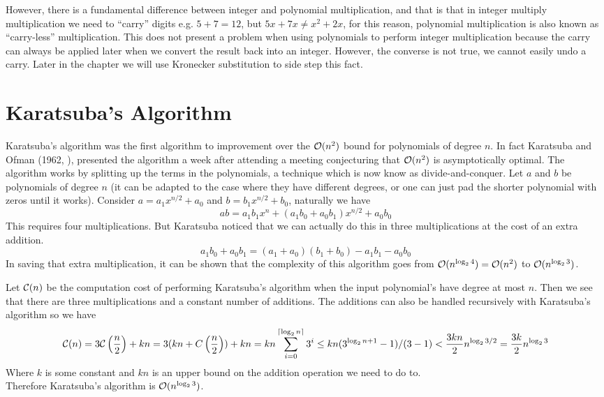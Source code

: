 However, there is a fundamental difference between integer and polynomial multiplication, and that is that in integer multiply multiplication we need to ``carry'' digits e.g. $5 + 7 = 12$, but $5x + 7x \neq x^2 + 2x$, for this reason, polynomial multiplication is also known as ``carry-less'' multiplication. This does not present a problem when using polynomials to perform integer multiplication because the carry can always be applied later when we convert the result back into an integer. However, the converse is not true, we cannot easily undo a carry. Later in the chapter we will use Kronecker substitution to side step this fact.

\section{Karatsuba's Algorithm}
\label{sec:prelim-karatsuba}

Karatsuba's algorithm was the first algorithm to improvement over the $\mathcal O(n^2)$ bound for polynomials of degree $n$. In fact Karatsuba and Ofman (1962, \cite{karatsuba}), presented the algorithm a week after attending a meeting conjecturing that $\mathcal O(n^2)$ is asymptotically optimal. The algorithm works by splitting up the terms in the polynomials, a technique which is now know as divide-and-conquer. Let $a$ and $b$ be polynomials of degree $n$ (it can be adapted to the case where they have different degrees, or one can just pad the shorter polynomial with zeros until it works). Consider $a = a_1x^{n/2} + a_0$ and $b = b_1x^{n/2} + b_0$, naturally we have
\[
    ab = a_1b_1x^n + (a_1b_0 + a_0b_1)x^{n/2} + a_0b_0
\]
This requires four multiplications. But Karatsuba noticed that we can actually do this in three multiplications at the cost of an extra addition.
\[
    a_1b_0 + a_0b_1 = (a_1 + a_0)(b_1 + b_0) - a_1b_1 - a_0b_0
\]
In saving that extra multiplication, it can be shown that the complexity of this algorithm goes from $\mathcal O(n^{\log_2 4}) = \mathcal O(n^2)$ to $\mathcal O(n^{\log_2 3})$.

Let $\mathcal C(n)$ be the computation cost of performing Karatsuba's algorithm when the input polynomial's have degree at most $n$. Then we see that there are three multiplications and a constant number of additions. The additions can also be handled recursively with Karatsuba's algorithm so we have
\[
    \mathcal C(n) = 3\mathcal C\left(\frac{n}{2}\right) + kn = 3(kn + C\left(\frac{n}{2}\right)) + kn = kn\sum^{\lceil \log_2 n\rceil}_{i=0} 3^i \leq kn(3^{\log_2 n + 1} - 1)/(3 - 1) < \frac{3kn}{2}n^{\log_2 3/2} = \frac{3k}{2}n^{\log_2 3}
\]
Where $k$ is some constant and $kn$ is an upper bound on the addition operation we need to do to.\\
Therefore Karatsuba's algorithm is $\mathcal O(n^{\log_2 3})$.

